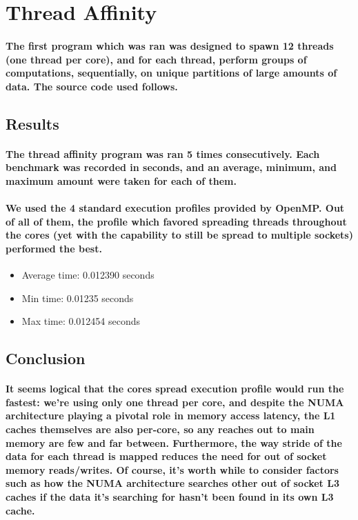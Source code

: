 \documentclass[8pt, a4paper, twoside, twoclumn, english]{extreport}
\begin{document}
\twocolumn
\section {Thread Affinity}

\paragraph {The first program which was ran was designed to spawn 12 threads (one thread per core), and for each thread,
perform groups of computations, sequentially, on unique partitions of large amounts of data. The source code used follows.}

\subsection{Results}

\paragraph{The thread affinity program was ran 5 times consecutively.
  Each benchmark was recorded in seconds, and an average, minimum,
  and maximum amount were taken for each of them. }

\paragraph{We used the 4 standard execution profiles provided by OpenMP. Out of all of them,
  the profile which favored spreading threads throughout the cores (yet with the capability to still be spread to multiple sockets)
  performed the best.}

\begin{itemize}
  \item Average time: 0.012390 seconds
  \item Min time: 0.01235 seconds
  \item Max time: 0.012454 seconds    
\end{itemize}

\subsection{Conclusion}

\paragraph{It seems logical that the cores spread execution profile would run the fastest: we're using only one thread per core, and despite the NUMA architecture playing a pivotal role in memory access latency, the L1 caches themselves are also per-core, so any reaches out to main memory are few and far between. Furthermore, the way stride of the data for each thread is mapped reduces the need for out of socket memory reads/writes. Of course, it's worth while to consider factors such as how the NUMA architecture searches other out of socket L3 caches if the data it's searching for hasn't been found in its own L3 cache.}
\end{document}
